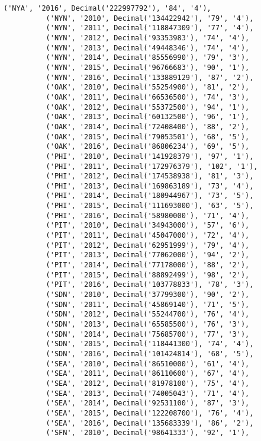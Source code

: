 \documentclass[11pt]{article}
\begin{document}
\begin{Verbatim}[commandchars=\\\{\}]
          ('NYA', '2016', Decimal('222997792'), '84', '4'),
          ('NYN', '2010', Decimal('134422942'), '79', '4'),
          ('NYN', '2011', Decimal('118847309'), '77', '4'),
          ('NYN', '2012', Decimal('93353983'), '74', '4'),
          ('NYN', '2013', Decimal('49448346'), '74', '4'),
          ('NYN', '2014', Decimal('85556990'), '79', '3'),
          ('NYN', '2015', Decimal('96766683'), '90', '1'),
          ('NYN', '2016', Decimal('133889129'), '87', '2'),
          ('OAK', '2010', Decimal('55254900'), '81', '2'),
          ('OAK', '2011', Decimal('66536500'), '74', '3'),
          ('OAK', '2012', Decimal('55372500'), '94', '1'),
          ('OAK', '2013', Decimal('60132500'), '96', '1'),
          ('OAK', '2014', Decimal('72408400'), '88', '2'),
          ('OAK', '2015', Decimal('79053501'), '68', '5'),
          ('OAK', '2016', Decimal('86806234'), '69', '5'),
          ('PHI', '2010', Decimal('141928379'), '97', '1'),
          ('PHI', '2011', Decimal('172976379'), '102', '1'),
          ('PHI', '2012', Decimal('174538938'), '81', '3'),
          ('PHI', '2013', Decimal('169863189'), '73', '4'),
          ('PHI', '2014', Decimal('180944967'), '73', '5'),
          ('PHI', '2015', Decimal('111693000'), '63', '5'),
          ('PHI', '2016', Decimal('58980000'), '71', '4'),
          ('PIT', '2010', Decimal('34943000'), '57', '6'),
          ('PIT', '2011', Decimal('45047000'), '72', '4'),
          ('PIT', '2012', Decimal('62951999'), '79', '4'),
          ('PIT', '2013', Decimal('77062000'), '94', '2'),
          ('PIT', '2014', Decimal('77178000'), '88', '2'),
          ('PIT', '2015', Decimal('88892499'), '98', '2'),
          ('PIT', '2016', Decimal('103778833'), '78', '3'),
          ('SDN', '2010', Decimal('37799300'), '90', '2'),
          ('SDN', '2011', Decimal('45869140'), '71', '5'),
          ('SDN', '2012', Decimal('55244700'), '76', '4'),
          ('SDN', '2013', Decimal('65585500'), '76', '3'),
          ('SDN', '2014', Decimal('75685700'), '77', '3'),
          ('SDN', '2015', Decimal('118441300'), '74', '4'),
          ('SDN', '2016', Decimal('101424814'), '68', '5'),
          ('SEA', '2010', Decimal('86510000'), '61', '4'),
          ('SEA', '2011', Decimal('86110600'), '67', '4'),
          ('SEA', '2012', Decimal('81978100'), '75', '4'),
          ('SEA', '2013', Decimal('74005043'), '71', '4'),
          ('SEA', '2014', Decimal('92531100'), '87', '3'),
          ('SEA', '2015', Decimal('122208700'), '76', '4'),
          ('SEA', '2016', Decimal('135683339'), '86', '2'),
          ('SFN', '2010', Decimal('98641333'), '92', '1'),

\end{Verbatim}
\end{document}
